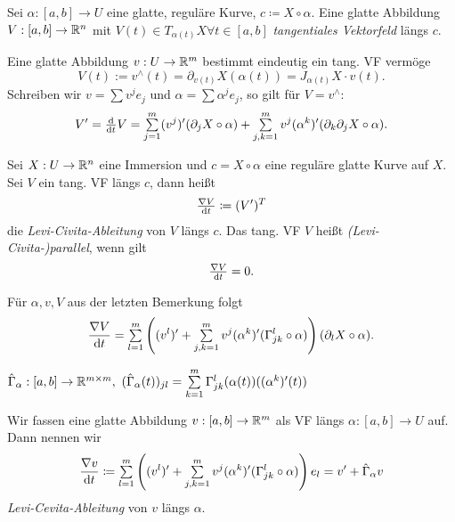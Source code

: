 \documentclass{cheat-sheet}
\begin{document}

\begin{defn}
  Sei $\alpha : [a, b] \to U$ eine glatte, reguläre Kurve, $c \coloneqq X \circ \alpha$. Eine glatte Abbildung $V : [a, b] \to \mathbb{R}^n$ mit $V(t) \in T_{\alpha(t)} X \forall t \in [a, b]$ \emph{tangentiales Vektorfeld} längs $c$.
\end{defn}


\begin{bem}
  Eine glatte Abbildung $v : U \to \mathbb{R}^m$ bestimmt eindeutig ein tang. VF vermöge
  \[ V(t) := v^\wedge(t) = \partial_{v(t)} X(\alpha(t)) = J_{\alpha(t)} X \cdot v(t). \]
  Schreiben wir $v = \sum v^j e_j$ und $\alpha = \sum \alpha^j e_j$, so gilt für $V = v^\wedge$:
  \[ V' = \tfrac{\d}{\d t} V = \sum_{j=1}^m (v^j)' (\partial_j X \circ \alpha) + \sum_{j,k=1}^m v^j (\alpha^k)' (\partial_k \partial_j X \circ \alpha). \]
\end{bem}

\begin{defn}
  Sei $X : U \to \mathbb{R}^n$ eine Immersion und $c = X \circ \alpha$ eine reguläre glatte Kurve auf $X$. Sei $V$ ein tang. VF längs $c$, dann heißt
  \[ \tfrac{\nabla V}{\mathrm{d} t} \coloneqq (V')^T \]
  die \emph{Levi-Civita-Ableitung} von $V$ längs $c$. Das tang. VF $V$ heißt \emph{(Levi-Civita-)parallel}, wenn gilt
  \[ \tfrac{\nabla V}{\mathrm{d} t} = 0. \]
\end{defn}

\begin{bem}
  Für $\alpha, v, V$ aus der letzten Bemerkung folgt
  \[ \frac{\nabla V}{\d t} = \sum_{l=1}^m \left( (v^l)' + \sum_{j,k=1}^m v^j (\alpha^k)' (\Gamma_{jk}^l \circ \alpha) \right) (\partial_l X \circ \alpha). \]
\end{bem}

\begin{nota}
  $\hat{\Gamma}_{\alpha} : [a, b] \to \R^{m \times m}, \,\, (\hat{\Gamma}_{\alpha}(t))_{jl} = \sum_{k=1}^m \Gamma_{jk}^l (\alpha(t))((\alpha^k)'(t))$
\end{nota}

\begin{defn}
  Wir fassen eine glatte Abbildung $v : [a, b] \to \mathbb{R}^m$ als VF längs $\alpha : [a, b] \to U$ auf. Dann nennen wir
  \[ \frac{\nabla v}{\d t} \coloneqq \sum_{l=1}^m \left( (v^l)' + \sum_{j,k=1}^m v^j (\alpha^k)' (\Gamma_{jk}^l \circ \alpha) \right) e_l = v' + \hat{\Gamma}_{\alpha} v \]
  \emph{Levi-Cevita-Ableitung} von $v$ längs $\alpha$.
\end{defn}
\end{document}
